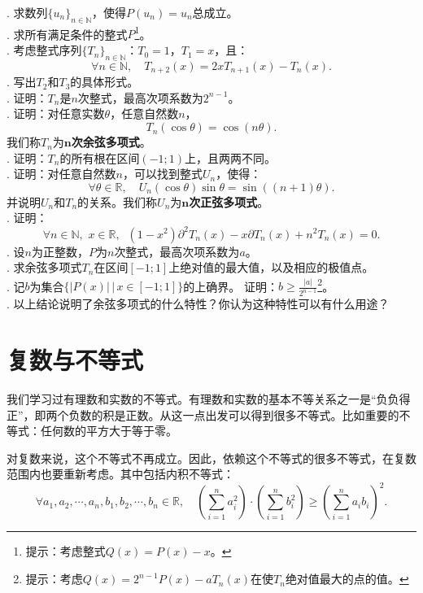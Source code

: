 \documentclass[12pt,UTF8,fontset=none]{ctexbook}
\begin{document}
\begin{appendix}
\begin{xt}
    . 求数列$\{u_n\}_{n\in\mathbb{N}}$，使得$P(u_n) = u_n$总成立。\\
    . 求所有满足条件的整式$P$\footnote{提示：考虑整式$Q(x) = P(x) - x$。}。\\
    . 考虑整式序列$\{T_n\}_{n\in\mathbb{N}}$：$T_0 = 1$，$T_1 = x$，且：
    $$ \forall n\in\mathbb{N}, \quad T_{n+2}(x) = 2xT_{n+1}(x) - T_n(x).$$
    . 写出$T_2$和$T_3$的具体形式。\\
    . 证明：$T_n$是$n$次整式，最高次项系数为$2^{n-1}$。\\
    . 证明：对任意实数$\theta$，任意自然数$n$，
    $$ T_n(\cos{\theta}) = \cos{(n\theta)}.$$
    我们称$T_n$为$\boldsymbol{n}$\textbf{次余弦多项式}。\\
    . 证明：$T_n$的所有根在区间$(-1;1)$上，且两两不同。\\
    . 证明：对任意自然数$n$，可以找到整式$U_n$，使得：
    $$ \forall \theta \in \mathbb{R}, \quad U_n(\cos{\theta}) \sin{\theta} = \sin{((n+1)\theta)}. $$
    并说明$U_n$和$T_n$的关系。我们称$U_n$为$\boldsymbol{n}$\textbf{次正弦多项式}。\\
    . 证明：
    $$ \forall n\in\mathbb{N},\,\, x\in\mathbb{R}, \;\; (1 - x^2)\partial^2 T_n(x) - x\partial T_n(x) + n^2 T_n(x) = 0.$$
    . 设$n$为正整数，$P$为$n$次整式，最高次项系数为$a$。\\
    . 求余弦多项式$T_n$在区间$[-1;1]$上绝对值的最大值，以及相应的极值点。\\
    . 记$b$为集合$\{|P(x)| \, | \, x\in[-1;1]\}$的上确界。
    证明：$b \geqslant \frac{|a|}{2^{n-1}}$\footnote{提示：考虑$Q(x) = 2^{n-1}P(x) - aT_n(x)$在使$T_n$绝对值最大的点的值。}。\\
    . 以上结论说明了余弦多项式的什么特性？你认为这种特性可以有什么用途？
\end{xt}

\section{复数与不等式}

我们学习过有理数和实数的不等式。有理数和实数的基本不等关系之一是“负负得正”，即两个负数的积是正数。从这一点出发可以得到很多不等式。比如重要的不等式：任何数的平方大于等于零。

对复数来说，这个不等式不再成立。因此，依赖这个不等式的很多不等式，在复数范围内也要重新考虑。其中包括内积不等式：
$$ \forall a_1, a_2, \cdots, a_n, b_1, b_2, \cdots, b_n \in \mathbb{R}, \quad \left(\sum_{i=1}^n a_i^2\right)\cdot\left(\sum_{i=1}^n b_i^2\right)\geqslant \left(\sum_{i=1}^n a_ib_i\right)^2.$$


\end{appendix}
\end{document}
